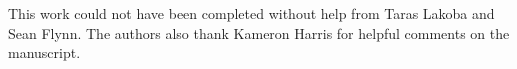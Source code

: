 This work could not have been completed without help from Taras Lakoba and Sean Flynn.
The authors also thank Kameron Harris for helpful comments on the manuscript.
